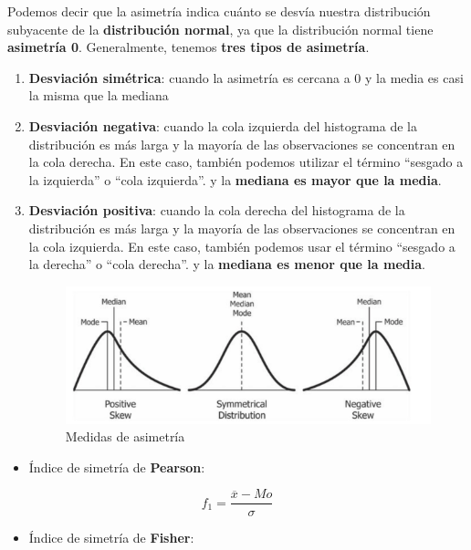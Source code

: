 \documentclass[
  11pt,
]{krantz}
\providecommand{\tightlist}{%
  \setlength{\itemsep}{0pt}\setlength{\parskip}{0pt}}
\theoremstyle{definition}
\theoremstyle{definition}
\theoremstyle{definition}
\theoremstyle{definition}
\theoremstyle{remark}
\begin{document}
Podemos decir que la asimetría indica cuánto se desvía nuestra distribución subyacente de la \textbf{distribución normal}, ya que la distribución normal tiene \textbf{asimetría 0}. Generalmente, tenemos \textbf{tres tipos de asimetría}.

\begin{enumerate}
\def\labelenumi{\arabic{enumi}.}
\item
  \textbf{Desviación simétrica}: cuando la asimetría es cercana a 0 y la media es casi la misma que la mediana
\item
  \textbf{Desviación negativa}: cuando la cola izquierda del histograma de la distribución es más larga y la mayoría de las observaciones se concentran en la cola derecha. En este caso, también podemos utilizar el término ``sesgado a la izquierda'' o ``cola izquierda''. y la \textbf{mediana es mayor que la media}.
\item
  \textbf{Desviación positiva}: cuando la cola derecha del histograma de la distribución es más larga y la mayoría de las observaciones se concentran en la cola izquierda. En este caso, también podemos usar el término ``sesgado a la derecha'' o ``cola derecha''. y la \textbf{mediana es menor que la media}.

  \begin{figure}
  \centering
  \includegraphics{simetria.png}
  \caption{Medidas de asimetría}
  \end{figure}
\end{enumerate}

\begin{itemize}
\tightlist
\item
  Índice de simetría de \textbf{Pearson}:
\end{itemize}

\[
 f_1=\frac{\overline{x}-Mo}{\sigma}
 \]

\begin{itemize}
\tightlist
\item
  Índice de simetría de \textbf{Fisher}:
\end{itemize}
\end{document}
